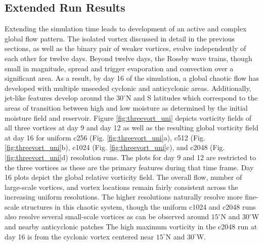 \documentclass{ametsoc}
\begin{document}
     \subsection{Extended Run Results}
Extending the simulation time leads to development of an active and complex global flow pattern.
The isolated vortex discussed in detail in the previous sections, as well as the binary
pair of weaker vortices, evolve independently of each other for twelve days. 
Beyond twelve days, the Rossby wave trains, though small in magnitude,
spread and trigger evaporation and convection over a significant area.
As a result, by day 16 of the simulation, a global chaotic flow has developed with multiple unseeded
cyclonic and anticyclonic areas.  Additionally, jet-like features
develop around the $30^\circ$N and S latitudes which correspond to the areas of transition between high and low moisture 
as determined by the initial moisture field and reservoir.
Figure \ref{fig:threevort_uni} depicts vorticity fields of all three vortices 
at day 9 and day 12 as well as the resulting global vorticity field at day 16
for uniform c256 (Fig. \ref{fig:threevort_uni}a), c512 (Fig. \ref{fig:threevort_uni}b),
c1024 (Fig. \ref{fig:threevort_uni}c), and c2048 (Fig. \ref{fig:threevort_uni}d) resolution
runs. The plots for day 9 and 12 are restricted to the three vortices as
these are the primary features during that time frame. Day 16 plots depict the 
global relative vorticity field. The overall flow, number of large-scale vortices,
and vortex locations remain fairly consistent across the increasing uniform resolutions.
The higher resolutions naturally resolve more fine-scale structures in this chaotic system, though
the uniform c1024 and c2048 runs also resolve several small-scale vortices as can be observed around $15^\circ$N and $30^\circ$W and nearby anticyclonic patches The high maximum vorticity in the c2048 run at day 16 is from the cyclonic vortex centered near $15^\circ$N and $30^\circ$W.
\end{document}
